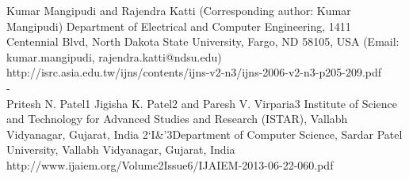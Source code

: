 \documentclass[journal]{IEEEtran}
\begin{document}
Kumar Mangipudi and Rajendra Katti
(Corresponding author: Kumar Mangipudi)
Department of Electrical and Computer Engineering, 1411 Centennial Blvd,
North Dakota State University, Fargo, ND 58105, USA (Email: {kumar.mangipudi, rajendra.katti}@ndsu.edu)
http://isrc.asia.edu.tw/ijns/contents/ijns-v2-n3/ijns-2006-v2-n3-p205-209.pdf\\

-\\
Pritesh N. Patel1
Jigisha K. Patel2
and Paresh V. Virparia3
Institute of Science and Technology for Advanced Studies and Research (ISTAR),
Vallabh Vidyanagar, Gujarat, India
2`I\&'3Department of Computer Science, Sardar Patel University,
Vallabh Vidyanagar, Gujarat, India
http://www.ijaiem.org/Volume2Issue6/IJAIEM-2013-06-22-060.pdf


%
%



%
%
\end{document}
